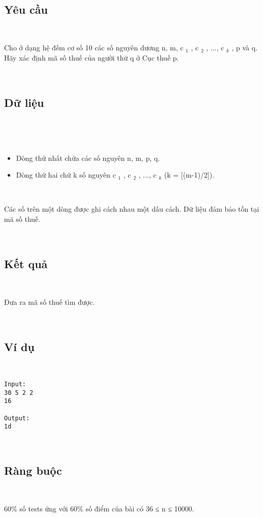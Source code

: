  

\subsection{\textbf{Yêu cầu }}

 

Cho ở dạng hệ đếm cơ số 10 các số nguyên dương n, m, c $_ 1 $ , c $_ 2 $ , ..., c $_ k $ , p và q. Hãy xác định mã số thuế của người thứ q ở Cục thuế p.

 

\subsection{\textbf{Dữ liệu }}

 

 
\begin{itemize}
	\item Dòng thứ nhất chứa các số nguyên n, m, p, q.
	\item Dòng thứ hai chứ k số nguyên c $_ 1 $ , c $_ 2 $ , ..., c $_ k $ (k = [(m-1)/2]).
\end{itemize}

 

Các số trên một dòng được ghi cách nhau một dấu cách. Dữ liệu đảm bảo tồn tại mã số thuế.

 

\subsection{\textbf{Kết quả }}

 

Đưa ra mã số thuế tìm được.

 

\subsection{\textbf{Ví dụ }}

 
\begin{verbatim}
Input:
30 5 2 2
16

Output:
1d
\end{verbatim}

 

\subsection{\textbf{Ràng buộc }}

 

60\% số tests ứng với 60\% số điểm của bài có 36 ≤ n ≤ 10000.
